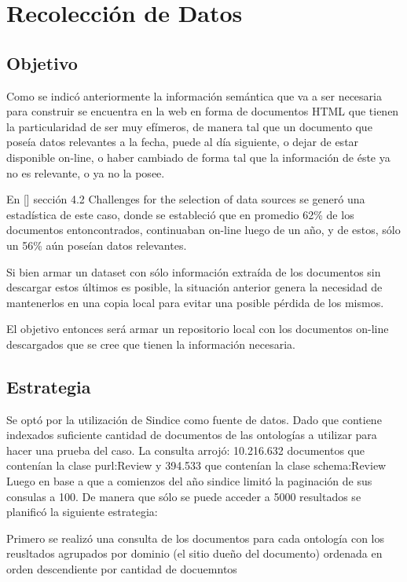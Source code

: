 \chapter{Recolección de Datos}
\label{chapter:recoleccion}

\section{Objetivo}
\label{section:recoleccion-objetivo}

Como se indicó anteriormente la información semántica que va a ser necesaria para construir se encuentra en la web en forma de documentos 
HTML que tienen la particularidad de ser muy efímeros, de manera tal que un documento que poseía datos relevantes a la fecha,
puede al día siguiente, o dejar de estar disponible on-line, o haber cambiado de forma tal que la información de éste ya no es 
relevante, o ya no la posee. 

En [] sección 4.2 Challenges for the selection of data sources se generó una estadística de este caso, donde se estableció que 
en promedio 62\% de los documentos entoncontrados, continuaban on-line luego de un año, y de estos, sólo un 56\% aún poseían 
datos relevantes. 

Si bien armar un dataset con sólo información extraída de los documentos sin descargar estos últimos es posible, la situación anterior 
genera la necesidad de mantenerlos en una copia local para evitar una posible pérdida de los mismos. 

El objetivo entonces será armar un repositorio local con los documentos on-line descargados que se cree que tienen la información 
necesaria. 

 
\section{Estrategia}
\label{section:recoleccion-estrategia}

Se optó por la utilización de Sindice como fuente de datos. Dado que contiene indexados suficiente cantidad de documentos de las 
ontologías a utilizar para hacer una prueba del caso.
La consulta arrojó: 10.216.632 documentos que contenían la clase purl:Review y 394.533 que contenían la clase schema:Review
Luego en base a que a comienzos del año sindice limitó la paginación de sus consulas a 100. De manera que sólo se puede acceder a 5000 
resultados se planificó la siguiente estrategia:

Primero se realizó una consulta de los documentos para cada ontología con los reusltados agrupados por dominio (el sitio dueño del documento) ordenada en orden descendiente por cantidad de docuemntos 

